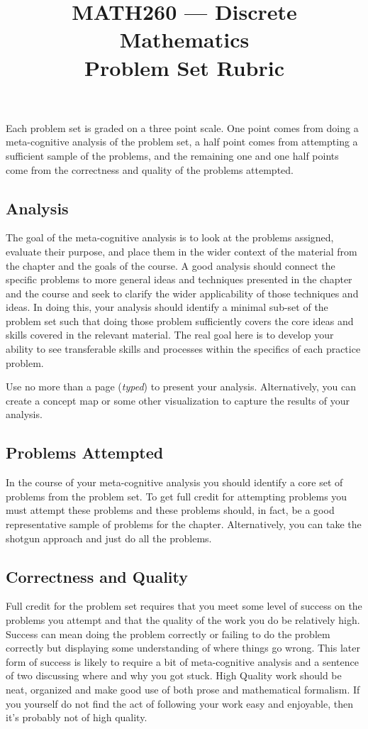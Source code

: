 \documentclass[nobib]{tufte-handout}
\title{MATH260 --- Discrete Mathematics \\  Problem Set Rubric}
\begin{document}
\maketitle

Each problem set is graded on a three point scale.  One point comes from doing a meta-cognitive analysis of the problem set, a half point comes from attempting a sufficient sample of the problems, and the remaining one and one half points come from the correctness and quality of the problems attempted.

\subsection*{Analysis}

The goal of the meta-cognitive analysis is to look at the problems assigned, evaluate their purpose, and place them in the wider context of the material from the chapter and the goals of the course. A good analysis should connect the specific problems to more general ideas and techniques presented in the chapter and the course and seek to clarify the wider applicability of those techniques and ideas. In doing this, your analysis should identify a minimal sub-set of the problem set such that doing those problem sufficiently covers the core ideas and skills covered in the relevant material.  The real goal here is to develop your ability to see transferable skills and processes within the specifics of each practice problem.

Use no more than a page (\textit{typed}) to present your analysis. Alternatively, you can create a concept map or some other visualization to capture the results of your analysis.

\subsection*{Problems Attempted}

In the course of your meta-cognitive analysis you should identify a core set of problems from the problem set.  To get full credit for attempting problems you must attempt these problems and these problems should, in fact, be a good representative sample of problems for the chapter. Alternatively, you can take the shotgun approach and just do all the problems.

\subsection*{Correctness and Quality}

Full credit for the problem set requires that you meet some level of success on the problems you attempt and that the quality of the work you do be relatively high. Success can mean doing the problem correctly or failing to do the problem correctly but displaying some understanding of where things go wrong.  This later form of success is likely to require a bit of meta-cognitive analysis and a sentence of two discussing where and why you got stuck. High Quality work should be neat, organized and make good use of both prose and mathematical formalism.  If you yourself do not find the act of following your work easy and enjoyable, then it's probably not of high quality.
\end{document}
